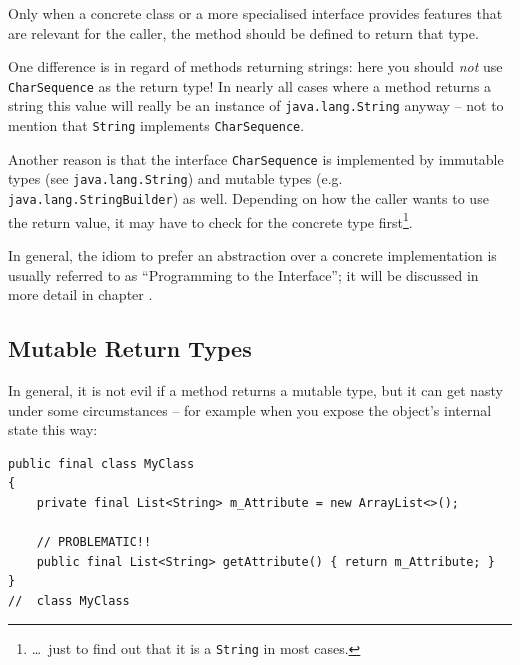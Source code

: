 Only when a concrete class or a more specialised interface provides features that are relevant for the caller, the method should be defined to return that type.

One difference is in regard of methods returning strings: here you should \textit{not} use \lstinline|CharSequence| as the return type! In nearly all cases where a method returns a string this value will really be an instance of \lstinline|java.lang.String|\autocite{ORACLE_DOC_STRING_CLASS} anyway – not to mention that \lstinline|String| implements \lstinline|CharSequence|.

Another reason is that the interface \lstinline|CharSequence| is implemented by immutable types (see \lstinline|java.lang.String|) and mutable types (e.g. \lstinline|java.lang.StringBuilder|) as well. Depending on how the caller wants to use the return value, it may have to check for the concrete type first\footnote{…~just to find out that it is a \lstinline|String| in most cases.}.

In general, the idiom to prefer an abstraction over a concrete implementation is usually referred to as “Programming to the Interface”; it will be discussed in more detail in chapter .


\subsection{Mutable Return Types}\label{sec:MutableReturnTypes}
In general, it is not evil if a method returns a mutable type, but it can get nasty under some circumstances – for example when you expose the object's internal state this way:
\begin{lstlisting}
public final class MyClass
{
    private final List<String> m_Attribute = new ArrayList<>();

    // PROBLEMATIC!!    
    public final List<String> getAttribute() { return m_Attribute; }
}
//  class MyClass    
\end{lstlisting}

